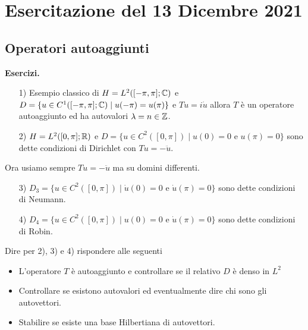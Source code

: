 
\section{Esercitazione del 13 Dicembre 2021}

\subsection{Operatori autoaggiunti}

\textbf{Esercizi.}
\begin{enumerate}
	\item[1)] Esempio classico di $H = L^2([-\pi, \pi]; \mathbb C)$ e $D = \{ u \in C^1([-\pi, \pi]; \mathbb C) \mid u(-\pi) = u(\pi) \}$ e $T u = i \dot u$ allora $T$ è un operatore autoaggiunto ed ha autovalori $\lambda = n \in \mathbb Z$.
	
	\item[2)] $H = L^2([0, \pi]; \mathbb R)$ e $D = \{ u \in C^2([0, \pi]) \mid u(0) = 0 \text{ e } u(\pi) = 0 \}$ sono dette condizioni di Dirichlet con $T u = - \ddot u$.
\end{enumerate}

Ora usiamo sempre $T u = -\ddot u$ ma su domini differenti.

\begin{enumerate}
	\item[3)] $D_3 = \{ u \in C^2([0, \pi]) \mid \dot u(0) = 0 \text{ e } \dot u(\pi) = 0 \}$ sono dette condizioni di Neumann.
	
	\item[4)] $D_4 = \{ u \in C^2([0, \pi]) \mid u(0) = 0 \text{ e } \dot u(\pi) = 0 \}$ sono dette condizioni di Robin.
\end{enumerate}
Dire per 2), 3) e 4) rispondere alle seguenti
\begin{itemize}
	\item L'operatore $T$ è autoaggiunto e controllare se il relativo $D$ è denso in $L^2$
	\item Controllare se esistono autovalori ed eventualmente dire chi sono gli autovettori.
	\item Stabilire se esiste una base Hilbertiana di autovettori.
\end{itemize}

